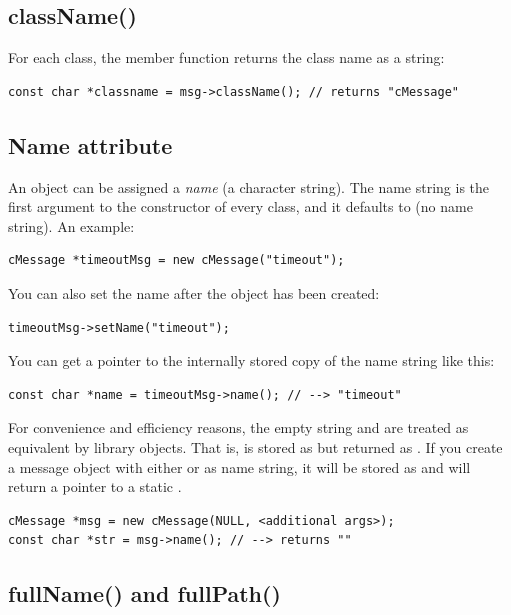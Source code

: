 \subsection{className()}
\label{sec:sim-lib:classname}


For each class, the  member function returns the class
name as a string:

\begin{verbatim}
const char *classname = msg->className(); // returns "cMessage"
\end{verbatim}


\subsection{Name attribute}
\label{sec:sim-lib:name}

An object can be assigned a \textit{name} (a character string). The name
string is the first argument to the constructor of every class,
and it defaults to  (no name string). An example:

\begin{verbatim}
cMessage *timeoutMsg = new cMessage("timeout");
\end{verbatim}

You can also set the name after the object has been created:

\begin{verbatim}
timeoutMsg->setName("timeout");
\end{verbatim}

You can get a pointer to the internally stored copy of the name
string like this:

\begin{verbatim}
const char *name = timeoutMsg->name(); // --> "timeout"
\end{verbatim}

For convenience and efficiency reasons, the empty string 
and  are treated as equivalent by library objects.
That is,  is stored as  but returned as .
If you create a message object with either 
or  as name string, it will be stored as 
and  will return a pointer to a static .

\begin{verbatim}
cMessage *msg = new cMessage(NULL, <additional args>);
const char *str = msg->name(); // --> returns ""
\end{verbatim}


\subsection{fullName() and fullPath()}
\label{sec:sim-lib:fullname-and-fullpath}


